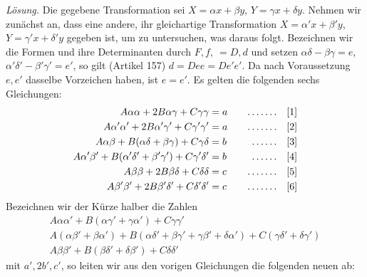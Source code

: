 \textit{Lösung.} Die gegebene Transformation sei $X=\alpha x+\beta y$, $Y=\gamma x+\delta y$. Nehmen wir zunächst an, dass eine andere, ihr gleichartige Transformation $X=\alpha'x+\beta'y$, $Y=\gamma'x+\delta'y$ gegeben ist, um zu untersuchen, was daraus folgt. Bezeichnen wir die Formen und ihre Determinanten durch $F,f,\ =D,d$ und setzen $\alpha\delta-\beta\gamma=e$, $\alpha'\delta'-\beta'\gamma'=e'$, so gilt (Artikel 157) $d=Dee=De'e'$. Da nach Voraussetzung $e,e'$ dasselbe Vorzeichen haben, ist $e=e'$. Es gelten die folgenden sechs Gleichungen:
\[
\begin{aligned}
A\alpha\alpha+2B\alpha\gamma+C\gamma\gamma&=a&\quad\mathinner{.\,.\,.\,.\,.\,.\,.}\quad&[1]\\
A\alpha'\alpha'+2B\alpha'\gamma'+C\gamma'\gamma'&=a&\quad\mathinner{.\,.\,.\,.\,.\,.\,.}\quad&[2]\\
A\alpha\beta+B(\alpha\delta+\beta\gamma)+C\gamma\delta&=b&\quad\mathinner{.\,.\,.\,.\,.\,.}\quad&[3]\\
A\alpha'\beta'+B(\alpha'\delta'+\beta'\gamma')+C\gamma'\delta'&=b&\quad\mathinner{.\,.\,.\,.\,.\,.}\quad&[4]\\
A\beta\beta+2B\beta\delta+C\delta\delta&=c&\quad\mathinner{.\,.\,.\,.\,.\,.\,.}\quad&[5]\\
A\beta'\beta'+2B\beta'\delta'+C\delta'\delta'&=c&\quad\mathinner{.\,.\,.\,.\,.\,.\,.}\quad&[6]
\end{aligned}
\]
Bezeichnen wir der Kürze halber die Zahlen
\[
\begin{gathered}
A\alpha\alpha'+B(\alpha\gamma'+\gamma\alpha')+C\gamma\gamma'\\
A(\alpha\beta'+\beta\alpha')+B(\alpha\delta'+\beta\gamma'+\gamma\beta'+\delta\alpha')+C(\gamma\delta'+\delta\gamma')\\
A\beta\beta'+B(\beta\delta'+\delta\beta')+C\delta\delta'
\end{gathered}
\]
mit $a',2b',c'$, so leiten wir aus den vorigen Gleichungen die folgenden neuen ab:
